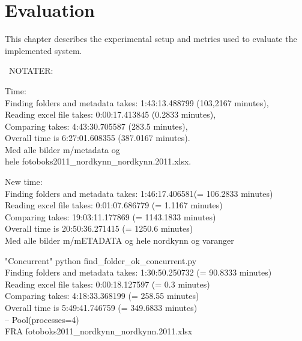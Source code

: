 \documentclass[USenglish]{uit-thesis}
\begin{document}
\chapter{Evaluation} \label{chap:evaluation}
This chapter describes the experimental setup and metrics used to evaluate the implemented system. 


\iffalse
\ NOTATER:

\item Time: \\
Finding folders and metadata takes:  1:43:13.488799 (103,2167 minutes), \\
Reading excel file takes:  0:00:17.413845 (0.2833 minutes),\\
Comparing takes:  4:43:30.705587 (283.5 minutes),\\
Overall time is  6:27:01.608355 (387.0167 minutes).\\
Med alle bilder m/metadata og \\
hele fotoboks2011\_nordkynn\_nordkynn.2011.xlsx.

\item New time: \\
Finding folders and metadata takes:  1:46:17.406581(= 106.2833 minutes) \\
Reading excel file takes:  0:01:07.686779 (= 1.1167 minutes) \\
Comparing takes:  19:03:11.177869 (= 1143.1833 minutes) \\
Overall time is  20:50:36.271415 (= 1250.6 minutes) \\
Med alle bilder m/mETADATA og hele nordkynn og varanger

\item "Concurrent" python find\_folder\_ok\_concurrent.py \\
Finding folders and metadata takes:  1:30:50.250732 (= 90.8333 minutes) \\
Reading excel file takes:  0:00:18.127597 (= 0.3 minutes)\\
Comparing takes:  4:18:33.368199 (= 258.55 minutes)\\
Overall time is  5:49:41.746759 (= 349.6833 minutes)\\
-- Pool(processes=4) \\
FRA fotoboks2011\_nordkynn\_nordkynn.2011.xlsx
\end{document}
